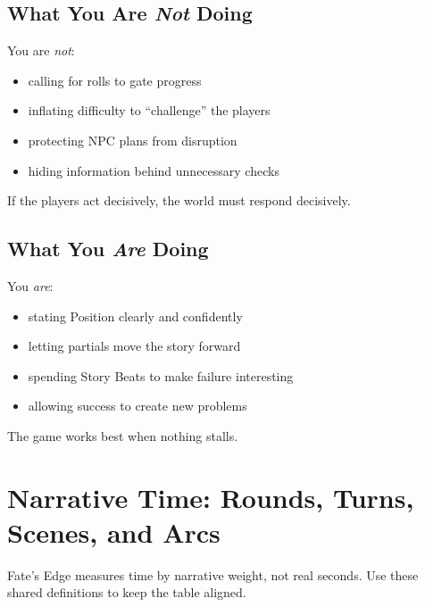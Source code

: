 \subsection{What You Are \emph{Not} Doing}
You are \emph{not}:
\begin{itemize}
\item calling for rolls to gate progress
\item inflating difficulty to ``challenge'' the players
\item protecting NPC plans from disruption
\item hiding information behind unnecessary checks
\end{itemize}
If the players act decisively, the world must respond decisively.

\subsection{What You \emph{Are} Doing}
You \emph{are}:
\begin{itemize}
\item stating Position clearly and confidently
\item letting partials move the story forward
\item spending Story Beats to make failure interesting
\item allowing success to create new problems
\end{itemize}
The game works best when nothing stalls.

\section{Narrative Time: Rounds, Turns, Scenes, and Arcs}
\label{sec:narrative-time}

Fate's Edge measures time by narrative weight, not real seconds. Use these shared definitions to keep the table aligned.

